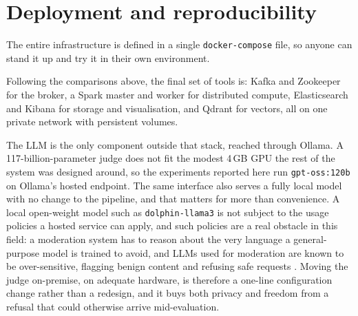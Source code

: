 \section{Deployment and reproducibility}\label{deployment-and-reproducibility}

The entire infrastructure is defined in a single \texttt{docker-compose} file, so anyone can stand it up and try it in their own environment.

Following the comparisons above, the final set of tools is: Kafka and Zookeeper for the broker, a Spark master and worker for distributed compute, Elasticsearch and Kibana for storage and visualisation, and Qdrant for vectors, all on one private network with persistent volumes.

The LLM is the only component outside that stack, reached through Ollama. A 117-billion-parameter judge does not fit the modest 4\,GB GPU the rest of the system was designed around, so the experiments reported here run \texttt{gpt-oss:120b} on Ollama's hosted endpoint. The same interface also serves a fully local model with no change to the pipeline, and that matters for more than convenience. A local open-weight model such as \texttt{dolphin-llama3} is not subject to the usage policies a hosted service can apply, and such policies are a real obstacle in this field: a moderation system has to reason about the very language a general-purpose model is trained to avoid, and LLMs used for moderation are known to be over-sensitive, flagging benign content and refusing safe requests \citep{moderationbias2025}. Moving the judge on-premise, on adequate hardware, is therefore a one-line configuration change rather than a redesign, and it buys both privacy and freedom from a refusal that could otherwise arrive mid-evaluation.
